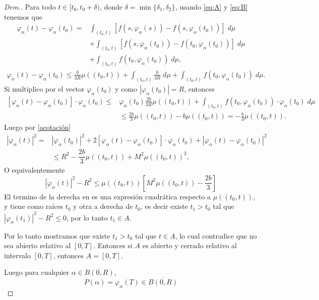 \begin{proof}[Dem.]
Para todo $t\in[t_0,t_0+\delta)$, donde $\delta=\min\{\delta_1,\delta_2\}$, usando \eqref{eq:A} y \eqref{eq:B} tenemos que 
\begin{equation*}
    \begin{split}
    \varphi_\alpha(t)-\varphi_\alpha(t_0) =& \int_{(t_0,t)}\left[f(s,\varphi_\alpha(s))-f(s,\varphi_\alpha(t_0))\right]\; d\mu\\& + \int_{(t_0,t)}\left[f(s,\varphi_\alpha(t_0))-f(t_0,\varphi_\alpha(t_0))\right]\; d\mu \\&+ \int_{(t_0,t)}f(t_0,\varphi_\alpha(t_0))\; d\mu,
    \end{split}
\end{equation*}
 \begin{equation*}
\begin{split}
\varphi_\alpha(t)-\varphi_\alpha(t_0) \leq \frac{b}{3R}\mu((t_0,t)) + \int_{(t_0,t)}\frac{b}{3R}\; d\mu + \int_{(t_0,t)}f(t_0,\varphi_\alpha(t_0))\; d\mu.
\end{split}
\end{equation*}		 
Si multiplico por el vector $\varphi_\alpha(t_0)$ y como $|\varphi_\alpha(t_0)|=R$, entonces
\begin{equation*}
\begin{split}
\left[\varphi_\alpha(t)-\varphi_\alpha(t_0)\right]\cdot \varphi_\alpha(t_0) \leq& \varphi_\alpha(t_0)\frac{2b}{3R}\mu((t_0,t)) + \int_{(t_0,t)}f(t_0,\varphi_\alpha(t_0))\cdot \varphi_\alpha(t_0)\; d\mu\\
&\leq \frac{2b}{3}\mu((t_0,t))-b\mu((t_0,t))=-\frac{b}{3}\mu((t_0,t)).
\end{split}
\end{equation*}
Luego por \eqref{acotación}
\begin{equation*}
    \begin{split}
    |\varphi_\alpha(t)|^2=&|\varphi_\alpha(t_0)|^2+2\left[\varphi_\alpha(t)-\varphi_\alpha(t_0)\right]\cdot\varphi_\alpha(t_0)+|\varphi_\alpha(t)-\varphi_\alpha(t_0)|^2\\
   &\leq R^2-\dfrac{2b}{3}\mu((t_0,t))+M^2 \mu((t_0,t))^2 ,  
    \end{split}
\end{equation*}
O equivalentemente
\begin{equation}
    |\varphi_\alpha(t)|^2-R^2\leq \mu((t_0,t))\left[M^2 \mu((t_0,t))-\dfrac{2b}{3}\right] 
\end{equation}
El termino de la derecha en es una expresión cuadrática respecto a $\mu((t_0,t))$, y tiene como raíces $t_0$ y otra a derecha de $t_0$, es decir existe $t_1>t_0$ tal que $|\varphi_\alpha(t_1)|^2-R^2\leq 0$, por lo tanto $t_1\in A$.
  		
 Por lo tanto mostramos que existe $t_1>t_0$ tal que $t\in A$, lo cual contradice que no sea abierto relativo al $[0,T]$. Entonces si $A$ es abierto y cerrado relativo al intervalo $[0,T]$, entonces $A=[0,T]$.
 	
Luego para cualquier $\alpha\in\overline{B(0,R)}$, $$P(\alpha)=\varphi_\alpha(T)\in\overline{B(0,R)}$$ 
 \end{proof}
 
